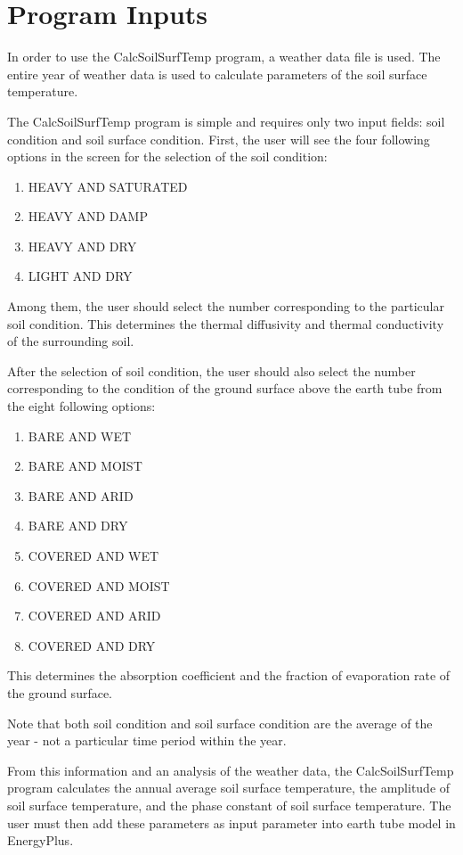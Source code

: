 \section{Program Inputs}\label{program-inputs}

In order to use the CalcSoilSurfTemp program, a weather data file is used. The entire year of weather data is used to calculate parameters of the soil surface temperature.

The CalcSoilSurfTemp program is simple and requires only two input fields: soil condition and soil surface condition. First, the user will see the four following options in the screen for the selection of the soil condition:

\begin{enumerate}
\def\labelenumi{\arabic{enumi}.}
\item
  HEAVY AND SATURATED
\item
  HEAVY AND DAMP
\item
  HEAVY AND DRY
\item
  LIGHT AND DRY
\end{enumerate}

Among them, the user should select the number corresponding to the particular soil condition. This determines the thermal diffusivity and thermal conductivity of the surrounding soil.

After the selection of soil condition, the user should also select the number corresponding to the condition of the ground surface above the earth tube from the eight following options:

\begin{enumerate}
\def\labelenumi{\arabic{enumi}.}
\item
  BARE AND WET
\item
  BARE AND MOIST
\item
  BARE AND ARID
\item
  BARE AND DRY
\item
  COVERED AND WET
\item
  COVERED AND MOIST
\item
  COVERED AND ARID
\item
  COVERED AND DRY
\end{enumerate}

This determines the absorption coefficient and the fraction of evaporation rate of the ground surface.

Note that both soil condition and soil surface condition are the average of the year - not a particular time period within the year.

From this information and an analysis of the weather data, the CalcSoilSurfTemp program calculates the annual average soil surface temperature, the amplitude of soil surface temperature, and the phase constant of soil surface temperature. The user must then add these parameters as input parameter into earth tube model in EnergyPlus.
